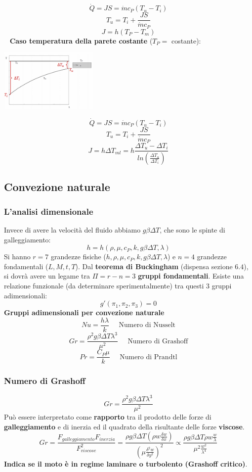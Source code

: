\[
    \dot{Q} = JS = \dot{m} c_P (T_u- T_i)
\]
\[
    T_u = T_i + \frac{JS}{\dot{m} c_P}
\]
\[
    J = h (T_P - T_m)
\]
\ \newline
\textbf{Caso temperatura della parete costante} ($T_P =$ costante):
\begin{center}
    \includegraphics[height=3cm]{../L11/img4.PNG}
\end{center}
\[
    \dot{Q} = JS = \dot{m} c_P (T_u - T_i)
\]
\[
    T_u = T_i + \frac{JS}{\dot{m}c_P}
\]
\[
    J = h \Delta T_{ml} = h \frac{\Delta T_u - \Delta T_i}{ln \left(\frac{\Delta T_u}{\Delta T_i}\right)}
\]
\subsection{Convezione naturale}
\subsubsection{L'analisi dimensionale}
Invece di avere la velocità del fluido abbiamo $g \beta \Delta T$, che sono le spinte di galleggiamento:
\[
    h = h(\rho, \mu, c_P, k, g \beta \Delta T, \lambda)
\]
Si hanno $r = 7$ grandezze fisiche ($h, \rho, \mu, c_P, k, g \beta \Delta T, \lambda$) e $n = 4$ grandezze fondamentali ($L, M, t, T$).\newline
\newline
Dal \textbf{teorema di Buckingham} (dispensa sezione $6.4$), si dovrà avere un legame tra $\Pi = r-n = 3$ \textbf{gruppi fondamentali}.\newline
\newline
Esiste una relazione funzionale (da determinare sperimentalmente) tra questi $3$ gruppi adimensionali:
\[
    g'(\pi_1, \pi_2, \pi_3) = 0
\]
\textbf{Gruppi adimensionali per convezione naturale}
\[
    Nu = \frac{h \lambda}{k} \;\;\;\;\;\text{Numero di Nusselt}
\]
\[
    Gr = \frac{\rho^2 g \beta \Delta T \lambda^3}{\mu^2} \;\;\;\;\;\text{Numero di Grashoff}
\]
\[
    Pr = \frac{C_P \mu}{k} \;\;\;\;\; \text{Numero di Prandtl}
\]
\subsubsection{Numero di Grashoff}
\[
    Gr = \frac{\rho^2 g \beta \Delta T \lambda^3}{\mu^2}
\]
Può essere interpretato come \textbf{rapporto} tra il prodotto delle forze di \textbf{galleggiamento} e di inerzia ed il quadrato della risultante delle forze \textbf{viscose}.
\[
    Gr = \frac{F_{galleggiamento}F_{inerzia}}{F_{viscose}^2} = \frac{\rho g \beta \Delta T \left(\rho w \frac{\delta w}{\delta x}\right)}{\left(\mu \frac{\delta^2 w}{\delta y^2}\right)^2} \propto \frac{\rho g \beta \Delta T \rho w \frac{w}{\lambda}}{\mu^2 \frac{w^2}{\lambda^4}}
\]
\textbf{Indica se il moto è in regime laminare o turbolento (Grashoff critico)}.
